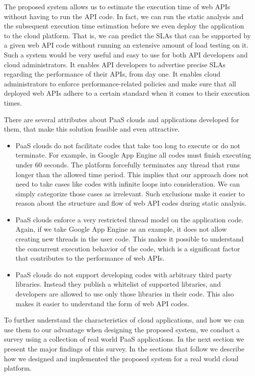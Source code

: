 The proposed system allows us to estimate the execution time of web APIs without having to
run the API code.
In fact, we can run the static analysis and the subsequent execution time
estimation before we even deploy the application to the cloud platform. 
That is, we can predict the SLAs that can be supported by a given web API code
without running an extensive amount of load testing on it. 
Such a system would be very useful and
easy to use for both API developers and cloud administrators. It enables API developers
to advertise precise SLAs regarding the performance of their APIs, from day one. It enables
cloud administrators to enforce performance-related policies and make sure that all deployed 
web APIs adhere to a certain standard when it comes to their execution times.

There are several attributes about PaaS
clouds and applications developed for them, that make this solution feasible and even attractive.

\begin{itemize}
\item PaaS clouds do not facilitate codes that take too long to execute or do not terminate. For 
example, in Google App Engine all codes must finish executing under 60 seconds.
The platform forcefully terminates any thread that runs longer than the allowed time period. This
implies that our approach does not need to take cases like codes with infinite loops into
consideration. We can simply categorize those cases as irrelevant. Such exclusions make it
easier to reason about the structure and flow of web API codes during static analysis.
\item PaaS clouds enforce a very restricted thread model on the application code. Again, if we take
Google App Engine as an example, it does not allow creating new threads in the user code. This
makes it possible to understand the concurrent execution behavior of the code, which is a significant
factor that contributes to the performance of web APIs.
\item PaaS clouds do not support developing codes with arbitrary third party libraries. Instead they
publish a whitelist of supported libraries, and developers are allowed to use only those libraries
in their code. This also makes it easier to understand the form of web API codes.
\end{itemize}

To further understand the characteristics of cloud applications, and how we can use them to our
advantage when designing the proposed system, we conduct a survey
using a collection of real world PaaS applications. In the next section we present the major findings
of this survey.
In the sections that follow we describe how we designed and implemented the proposed system
 for a real world cloud platform.